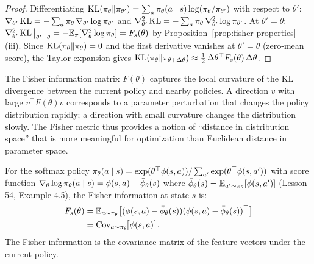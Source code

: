\documentclass[11pt,a4paper]{article}
\begin{document}
\begin{proof}
Differentiating $\operatorname{KL}(\pi_\theta \| \pi_{\theta'})
= \sum_a \pi_\theta(a \mid s) \log(\pi_\theta / \pi_{\theta'})$
with respect to $\theta'$:
$\nabla_{\theta'} \operatorname{KL} = -\sum_a \pi_\theta\, \nabla_{\theta'}
\log \pi_{\theta'}$ and
$\nabla_{\theta'}^2 \operatorname{KL} = -\sum_a \pi_\theta\, \nabla_{\theta'}^2
\log \pi_{\theta'}$. At $\theta' = \theta$:
$\nabla_{\theta'}^2 \operatorname{KL}\big|_{\theta'=\theta}
= -\mathbb{E}_\pi[\nabla_\theta^2 \log \pi_\theta] = F_s(\theta)$
by Proposition~\ref{prop:fisher-properties}(iii). Since
$\operatorname{KL}(\pi_\theta \| \pi_\theta) = 0$ and the first derivative
vanishes at $\theta' = \theta$ (zero-mean score), the Taylor expansion
gives $\operatorname{KL}(\pi_\theta \| \pi_{\theta+\Delta\theta})
\approx \frac{1}{2}\, \Delta\theta^\top F_s(\theta)\, \Delta\theta$.
\end{proof}

\begin{keyresult}[title={Fisher Information as KL Curvature}]
The Fisher information matrix $F(\theta)$ captures the local curvature
of the KL divergence between the current policy and nearby policies.
A direction $v$ with large $v^\top F(\theta) v$ corresponds to a
parameter perturbation that changes the policy distribution rapidly;
a direction with small curvature changes the distribution slowly.
The Fisher metric thus provides a notion of ``distance in distribution
space'' that is more meaningful for optimization than Euclidean distance
in parameter space.
\end{keyresult}

\begin{example}
\label{ex:fisher-softmax}
For the softmax policy $\pi_\theta(a \mid s) = \exp(\theta^\top
\phi(s,a)) / \sum_{a'} \exp(\theta^\top \phi(s,a'))$ with score
function $\nabla_\theta \log \pi_\theta(a \mid s) = \phi(s,a) -
\bar{\phi}_\theta(s)$ where $\bar{\phi}_\theta(s) = \mathbb{E}_{a' \sim
\pi_\theta}[\phi(s,a')]$ (Lesson 54, Example 4.5), the Fisher
information at state $s$ is:
\begin{align*}
  F_s(\theta) &= \mathbb{E}_{a \sim \pi_\theta}\!\left[
    (\phi(s,a) - \bar{\phi}_\theta(s))
    (\phi(s,a) - \bar{\phi}_\theta(s))^\top\right] \\
  &= \operatorname{Cov}_{a \sim \pi_\theta}\!\bigl[\phi(s,a)\bigr].
\end{align*}
The Fisher information is the covariance matrix of the feature vectors
under the current policy.
\end{example}
\end{document}
